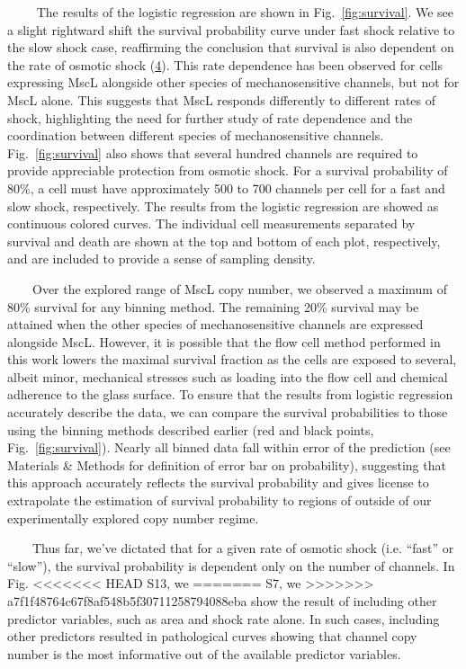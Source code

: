 ~~~~
The
results
of the
logistic
regression
are
shown
in
Fig.~\ref{fig:survival}.
We see
a
slight
rightward
shift
the
survival
probability
curve
under
fast
shock
relative
to the
slow
shock
case,
reaffirming
the
conclusion
that
survival
is
also
dependent
on the
rate
of
osmotic
shock
(\protect\hyperlink{ref-bialecka-fornal2015}{4}).
This
rate
dependence
has
been
observed
for
cells
expressing
MscL
alongside
other
species
of
mechanosensitive
channels,
but
not
for
MscL
alone.
This
suggests
that
MscL
responds
differently
to
different
rates
of
shock,
highlighting
the
need
for
further
study
of
rate
dependence
and
the
coordination
between
different
species
of
mechanosensitive
channels.
Fig.~\ref{fig:survival}
also
shows
that
several
hundred
channels
are
required
to
provide
appreciable
protection
from
osmotic
shock.
For a
survival
probability
of
80\%,
a cell
must
have
approximately
500 to
700
channels
per
cell
for a
fast
and
slow
shock,
respectively.
The
results
from
the
logistic
regression
are
showed
as
continuous
colored
curves.
The
individual
cell
measurements
separated
by
survival
and
death
are
shown
at the
top
and
bottom
of
each
plot,
respectively,
and
are
included
to
provide
a
sense
of
sampling
density.

~~~~Over
the
explored
range
of
MscL
copy
number,
we
observed
a
maximum
of
80\%
survival
for
any
binning
method.
The
remaining
20\%
survival
may be
attained
when
the
other
species
of
mechanosensitive
channels
are
expressed
alongside
MscL.
However,
it is
possible
that
the
flow
cell
method
performed
in
this
work
lowers
the
maximal
survival
fraction
as the
cells
are
exposed
to
several,
albeit
minor,
mechanical
stresses
such
as
loading
into
the
flow
cell
and
chemical
adherence
to the
glass
surface.
To
ensure
that
the
results
from
logistic
regression
accurately
describe
the
data,
we can
compare
the
survival
probabilities
to
those
using
the
binning
methods
described
earlier
(red
and
black
points,
Fig.~\ref{fig:survival}).
Nearly
all
binned
data
fall
within
error
of the
prediction
(see
Materials
\&
Methods
for
definition
of
error
bar on
probability),
suggesting
that
this
approach
accurately
reflects
the
survival
probability
and
gives
license
to
extrapolate
the
estimation
of
survival
probability
to
regions
of
outside
of our
experimentally
explored
copy
number
regime.

~~~~Thus
far,
we've
dictated
that
for a
given
rate
of
osmotic
shock
(i.e.
``fast''
or
``slow''),
the
survival
probability
is
dependent
only
on the
number
of
channels.
In
Fig.
<<<<<<< HEAD
S13,
we
=======
S7, we
>>>>>>> a7f1f48764c67f8af548b5f30711258794088eba
show
the
result
of
including
other
predictor
variables,
such
as
area
and
shock
rate
alone.
In
such
cases,
including
other
predictors
resulted
in
pathological
curves
showing
that
channel
copy
number
is the
most
informative
out of
the
available
predictor
variables.

